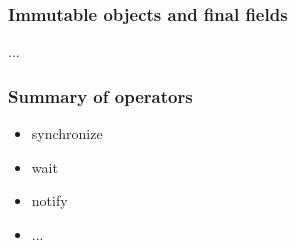 \documentclass[aspectratio=169]{beamer}
\begin{document}
\begin{frame}\frametitle{Immutable objects and final fields}
...
\end{frame}

\begin{frame}[t]\frametitle{Summary of operators}
\begin{itemize}
  \item synchronize
  \item wait
  \item notify
  \item ...
\end{itemize}

\end{frame}

\end{document}
